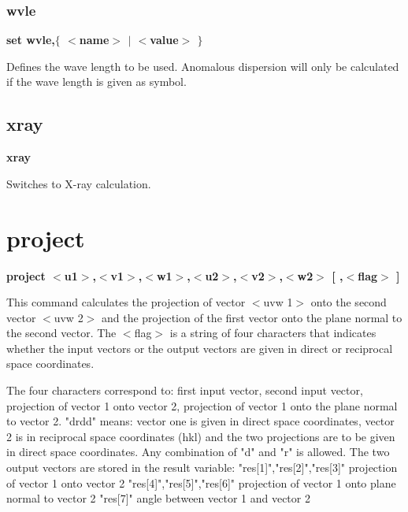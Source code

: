 \subsubsection{wvle}
{\bf set wvle,$ \{$ $ <$name$> $ $| $ $ <$value$> $ $\} $ \par }
\par
\vspace{3pt}
Defines the wave length to be used. Anomalous dispersion will only 
be calculated if the wave length is given as symbol. 
\subsection*{xray}
{\bf xray \par }
\par
\vspace{3pt}
Switches to X-ray calculation. 
\section{project}
{\bf project $ <$u1$> $,$ <$v1$> $,$ <$w1$> $,$ <$u2$> $,$ <$v2$> $,$ <$w2$> $ [ ,$ <$flag$> $ ] \par }
\par
\vspace{3pt}
This command calculates the projection of vector $ <$uvw 1$> $ onto the second 
vector $ <$uvw 2$> $ and the projection of the first vector onto the plane normal 
to the second vector. 
The $ <$flag$> $ is a string of four characters that indicates whether the input 
vectors or the output vectors are given in direct or reciprocal space 
coordinates. 
\par
\begin{MacVerbatim}
The four characters correspond to:
    first input vector,
    second input vector,
    projection of vector 1 onto vector 2,
    projection of vector 1 onto the plane normal to vector 2.
"drdd" means: vector one is given in direct space coordinates, vector 2
              is in reciprocal space coordinates (hkl) and the two
              projections are to be given in direct space coordinates.
Any combination of "d" and "r" is allowed.
The two output vectors are stored in the result variable:
"res[1]","res[2]","res[3]" projection of vector 1 onto vector 2
"res[4]","res[5]","res[6]" projection of vector 1 onto plane normal to
                           vector 2
"res[7]"                   angle between vector 1 and vector 2
\end{MacVerbatim}
